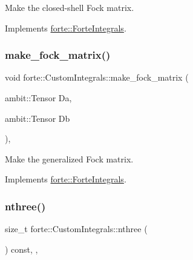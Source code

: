 Make the closed-\/shell Fock matrix. 



Implements \mbox{\hyperlink{classforte_1_1_forte_integrals_a4cdca0a7587cad9d830ed3b333ec78cf}{forte\+::\+Forte\+Integrals}}.

\mbox{\label{classforte_1_1_custom_integrals_aae47837ebc64bb62efb0c23107ebfafa}} 
\subsubsection{\texorpdfstring{make\+\_\+fock\+\_\+matrix()}{make\_fock\_matrix()}}
{\footnotesize\ttfamily void forte\+::\+Custom\+Integrals\+::make\+\_\+fock\+\_\+matrix (\begin{DoxyParamCaption}\item[{ambit\+::\+Tensor}]{Da,  }\item[{ambit\+::\+Tensor}]{Db }\end{DoxyParamCaption})\hspace{0.3cm}{\ttfamily [override]}, {\ttfamily [virtual]}}



Make the generalized Fock matrix. 



Implements \mbox{\hyperlink{classforte_1_1_forte_integrals_aadd195fbc0c7f7b659ab9280457568e0}{forte\+::\+Forte\+Integrals}}.

\mbox{\label{classforte_1_1_custom_integrals_aa8813730038bbc062d8e08d33600c27d}} 
\subsubsection{\texorpdfstring{nthree()}{nthree()}}
{\footnotesize\ttfamily size\+\_\+t forte\+::\+Custom\+Integrals\+::nthree (\begin{DoxyParamCaption}{ }\end{DoxyParamCaption}) const\hspace{0.3cm}{\ttfamily [inline]}, {\ttfamily [override]}, {\ttfamily [virtual]}}



